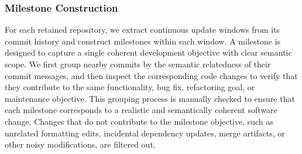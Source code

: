 \documentclass{llmxive}
\begin{document}
\begin{table}[t]
\centering
\small
{}
\caption{Repository and domain coverage of SWE-Chain-Evo. Repository domains are assigned using a single primary label for dataset characterization.}
\label{tab:swe_chain_domains}
\end{table}

\subsubsection{Milestone Construction}
\label{app:swe_milestone_construction}
For each retained repository, we extract continuous update windows from its commit history and construct milestones within each window. A milestone is designed to capture a single coherent development objective with clear semantic scope. We first group nearby commits by the semantic relatedness of their commit messages, and then inspect the corresponding code changes to verify that they contribute to the same functionality, bug fix, refactoring goal, or maintenance objective. This grouping process is manually checked to ensure that each milestone corresponds to a realistic and semantically coherent software change. Changes that do not contribute to the milestone objective, such as unrelated formatting edits, incidental dependency updates, merge artifacts, or other noisy modifications, are filtered out.
\end{document}
